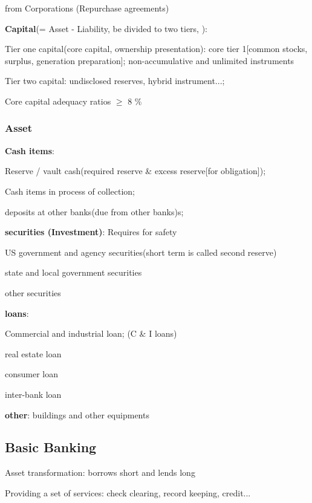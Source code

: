 \documentclass[10pt, a4paper]{article}
\begin{document}
            \quad from Corporations (Repurchase agreements) 

            \textbf{Capital}(= Asset - Liability, be divided to two tiers, ): 

            \quad Tier one capital(core capital, ownership presentation): core tier 1[common stocks, surplus, generation preparation]; non-accumulative and unlimited instruments 
            
            \quad Tier two capital: undisclosed reserves, hybrid instrument...; 

            \quad Core capital adequacy ratios $\geq$ 8 \% 
    
        \subsubsection{Asset} 
            \textbf{Cash items}: 
    
            \quad Reserve / vault cash(required reserve \& excess reserve[for obligation]); 
            
            \quad Cash items in process of collection; 
            
            \quad deposits at other banks(due from other banks)s; 

            \textbf{securities (Investment)}: Requires for safety
                
            \quad US government and agency securities(short term is called second reserve)

            \quad state and local government securities 

            \quad other securities 

            \textbf{loans}:
                
            \quad Commercial and industrial loan; (C \& I loans) 

            \quad real estate loan 

            \quad consumer loan 

            \quad inter-bank loan 
                
            \textbf{other}: buildings and other equipments 
    \subsection{Basic Banking}
        Asset transformation: borrows short and lends long

        Providing a set of services: check clearing, record keeping, credit...
\end{document}

